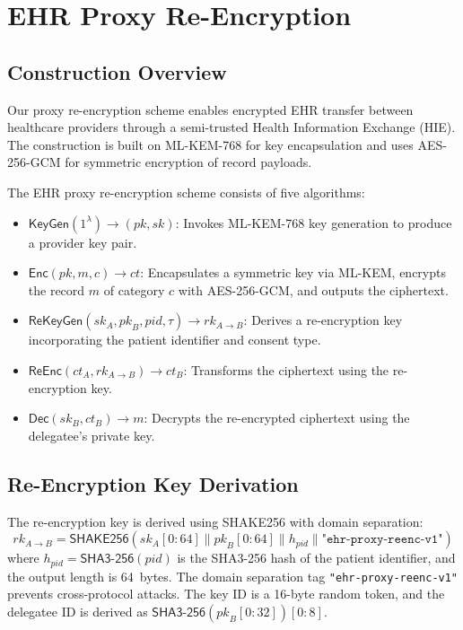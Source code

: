 \documentclass[conference,10pt]{IEEEtran}
\newcommand{\mlkem}{\textsf{ML-KEM}}
\newcommand{\shake}{\textsf{SHAKE256}}
\newcommand{\shaiii}{\textsf{SHA3-256}}
\newcommand{\aesgcm}{\textsf{AES-256-GCM}}
\newcommand{\Enc}{\mathsf{Enc}}
\newcommand{\Dec}{\mathsf{Dec}}
\newcommand{\ReEnc}{\mathsf{ReEnc}}
\newcommand{\KeyGen}{\mathsf{KeyGen}}
\newcommand{\ReKeyGen}{\mathsf{ReKeyGen}}
\begin{document}
\section{EHR Proxy Re-Encryption}
\label{sec:pre}

\subsection{Construction Overview}

Our proxy re-encryption scheme enables encrypted EHR transfer between healthcare providers through a semi-trusted Health Information Exchange (HIE). The construction is built on \mlkem{}-768 for key encapsulation and uses \aesgcm{} for symmetric encryption of record payloads.

\begin{definition}
The EHR proxy re-encryption scheme consists of five algorithms:
\begin{itemize}[leftmargin=*]
    \item $\KeyGen(1^\lambda) \rightarrow (\mathit{pk}, \mathit{sk})$: Invokes \mlkem{}-768 key generation to produce a provider key pair.
    \item $\Enc(\mathit{pk}, m, c) \rightarrow \mathit{ct}$: Encapsulates a symmetric key via \mlkem{}, encrypts the record $m$ of category $c$ with \aesgcm{}, and outputs the ciphertext.
    \item $\ReKeyGen(\mathit{sk}_A, \mathit{pk}_B, \mathit{pid}, \tau) \rightarrow \mathit{rk}_{A \to B}$: Derives a re-encryption key incorporating the patient identifier and consent type.
    \item $\ReEnc(\mathit{ct}_A, \mathit{rk}_{A \to B}) \rightarrow \mathit{ct}_B$: Transforms the ciphertext using the re-encryption key.
    \item $\Dec(\mathit{sk}_B, \mathit{ct}_B) \rightarrow m$: Decrypts the re-encrypted ciphertext using the delegatee's private key.
\end{itemize}
\end{definition}

\subsection{Re-Encryption Key Derivation}

The re-encryption key is derived using \shake{} with domain separation:
\begin{equation}
\label{eq:rekey}
\mathit{rk}_{A \to B} = \shake{}(\mathit{sk}_A[0{:}64] \| \mathit{pk}_B[0{:}64] \| h_{\mathit{pid}} \| \texttt{"ehr-proxy-reenc-v1"})
\end{equation}
where $h_{\mathit{pid}} = \shaiii{}(\mathit{pid})$ is the SHA3-256 hash of the patient identifier, and the output length is 64~bytes. The domain separation tag \texttt{"ehr-proxy-reenc-v1"} prevents cross-protocol attacks. The key ID is a 16-byte random token, and the delegatee ID is derived as $\shaiii{}(\mathit{pk}_B[0{:}32])[0{:}8]$.
\end{document}
